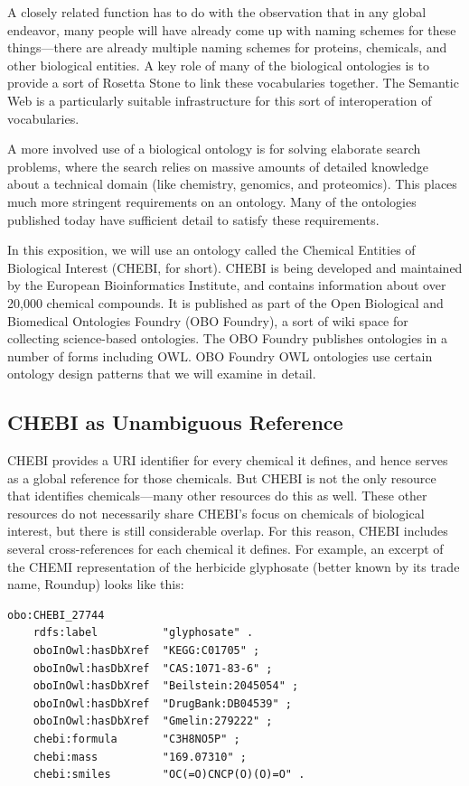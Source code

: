 A closely related function has to do with the observation that in any
global endeavor, many people will have already come up with naming
schemes for these things---there are already multiple naming schemes for
proteins, chemicals, and other biological entities. A key role of many
of the biological ontologies is to provide a sort of Rosetta Stone to
link these vocabularies together. The Semantic Web is a particularly
suitable infrastructure for this sort of interoperation of vocabularies.

A more involved use of a biological ontology is for solving elaborate
search problems, where the search relies on massive amounts of detailed
knowledge about a technical domain (like chemistry, genomics, and
proteomics). This places much more stringent requirements on an
ontology. Many of the ontologies published today have sufficient detail
to satisfy these requirements.

In this exposition, we will use an ontology called the Chemical Entities
of Biological Interest (CHEBI, for short). CHEBI is being developed and
maintained by the European Bioinformatics Institute, and contains
information about over 20,000 chemical compounds. It is published as
part of the Open Biological and Biomedical Ontologies Foundry (OBO
Foundry), a sort of wiki space for collecting science-based ontologies.
The OBO Foundry publishes ontologies in a number of forms including OWL.
OBO Foundry OWL ontologies use certain ontology design patterns that we
will examine in detail.

\subsection{CHEBI as Unambiguous Reference}

CHEBI provides a URI identifier for every chemical it defines, and hence
serves as a global reference for those chemicals. But CHEBI is not the
only resource that identifies chemicals---many other
resources do this as well. These other resources do not necessarily
share CHEBI's focus on chemicals of biological interest, but there is
still considerable overlap. For this reason, CHEBI includes several
cross-references for each chemical it defines. For example, an excerpt of the 
CHEMI representation of the
herbicide glyphosate (better known by its trade name, Roundup) looks like this: 

\begin{lstlisting}
obo:CHEBI_27744  
    rdfs:label          "glyphosate" .
    oboInOwl:hasDbXref  "KEGG:C01705" ;
    oboInOwl:hasDbXref  "CAS:1071-83-6" ;
    oboInOwl:hasDbXref  "Beilstein:2045054" ;
    oboInOwl:hasDbXref  "DrugBank:DB04539" ;
    oboInOwl:hasDbXref  "Gmelin:279222" ;
    chebi:formula       "C3H8NO5P" ;
    chebi:mass          "169.07310" ;
    chebi:smiles        "OC(=O)CNCP(O)(O)=O" .
\end{lstlisting}

